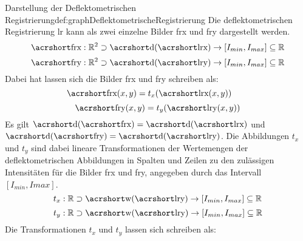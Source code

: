 \begin{Definition}{Darstellung der Deflektometrischen Registrierung}{def:graphDeflektometrischeRegistrierung}
	Die deflektometrischen Registrierung \acrshort{lr} kann als zwei einzelne Bilder \acrshort{frx} und \acrshort{fry} dargestellt werden.
	\begin{equation*}
		\acrshortmath{frx} : \mathbb{R}^2 \supset \acrshortmath{d}(\acrshortmath{lrx}) \rightarrow [I_{min},I_{max}] \subseteq \mathbb{R}
	\end{equation*}
	\begin{equation*}
		\acrshortmath{fry} : \mathbb{R}^2 \supset \acrshortmath{d}(\acrshortmath{lry}) \rightarrow [I_{min},I_{max}] \subseteq \mathbb{R}
	\end{equation*}
	Dabei hat lassen sich die Bilder \acrshort{frx} und \acrshort{fry} schreiben als:
	\begin{equation*}
		\acrshortmath{frx}(x,y) = t_x(\acrshortmath{lrx}(x,y))
		\qquad
	\end{equation*}
	\begin{equation*}
		\acrshortmath{fry}(x,y) = t_y(\acrshortmath{lry}(x,y))
	\end{equation*}
	Es gilt $\acrshortmath{d}(\acrshortmath{frx}) = \acrshortmath{d}(\acrshortmath{lrx})$ und $\acrshortmath{d}(\acrshortmath{fry}) = \acrshortmath{d}(\acrshortmath{lry})$.
	Die Abbildungen $t_x$ und $t_y$ sind dabei lineare Transformationen der Wertemengen der deflektometrischen Abbildungen in Spalten und Zeilen zu den zulässigen Intensitäten für die Bilder \acrshort{frx} und \acrshort{fry}, angegeben durch das Intervall $[I_{min},I{max}]$.
	\begin{equation*}
		t_x : \mathbb{R} \supset \acrshortmath{w}(\acrshortmath{lry}) \rightarrow [I_{min},I_{max}] \subseteq \mathbb{R}
	\end{equation*}
	\begin{equation*}
		t_y : \mathbb{R} \supset \acrshortmath{w}(\acrshortmath{lry}) \rightarrow [I_{min},I_{max}] \subseteq \mathbb{R}
	\end{equation*}
	Die Transformationen $t_x$ und $t_y$ lassen sich schreiben als:
	
\end{Definition}